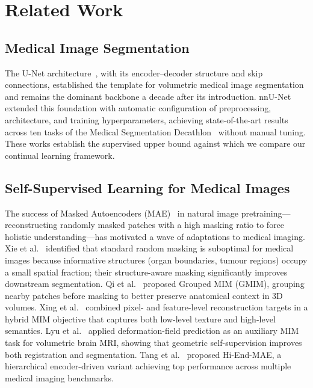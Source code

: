 \documentclass[conference]{IEEEtran}
\begin{document}
\section{Related Work}

\subsection{Medical Image Segmentation}

The U-Net architecture~\cite{ronneberger2015unet}, with its encoder–decoder structure and skip connections, established the template for volumetric medical image segmentation and remains the dominant backbone a decade after its introduction. nnU-Net~\cite{isensee2021nnunet} extended this foundation with automatic configuration of preprocessing, architecture, and training hyperparameters, achieving state-of-the-art results across ten tasks of the Medical Segmentation Decathlon~\cite{simpson2022decathlon} without manual tuning. These works establish the supervised upper bound against which we compare our continual learning framework.

\subsection{Self-Supervised Learning for Medical Images}

The success of Masked Autoencoders (MAE)~\cite{he2022mae} in natural image pretraining—reconstructing randomly masked patches with a high masking ratio to force holistic understanding—has motivated a wave of adaptations to medical imaging. Xie et al.~\cite{xie2024rethinking} identified that standard random masking is suboptimal for medical images because informative structures (organ boundaries, tumour regions) occupy a small spatial fraction; their structure-aware masking significantly improves downstream segmentation. Qi et al.~\cite{qi2024gmim} proposed Grouped MIM (GMIM), grouping nearby patches before masking to better preserve anatomical context in 3D volumes. Xing et al.~\cite{xing2024hybridmim} combined pixel- and feature-level reconstruction targets in a hybrid MIM objective that captures both low-level texture and high-level semantics. Lyu et al.~\cite{lyu2025masked} applied deformation-field prediction as an auxiliary MIM task for volumetric brain MRI, showing that geometric self-supervision improves both registration and segmentation. Tang et al.~\cite{tang2026hiendmae} proposed Hi-End-MAE, a hierarchical encoder-driven variant achieving top performance across multiple medical imaging benchmarks.
\end{document}

